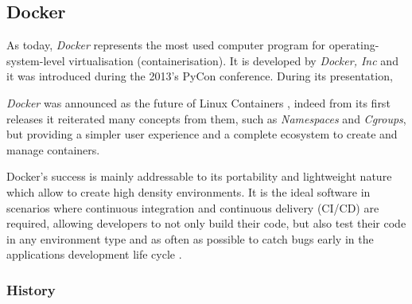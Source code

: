 \documentclass[a4paper,12pt]{article}
\begin{document}
\subsection{Docker}

As today, \textit{Docker} represents the most used computer program for
operating-system-level virtualisation (containerisation). It is developed by
\textit{Docker, Inc} \cite{docker_official_site} and it was introduced during the
2013's PyCon conference. During its presentation, \par\textit{Docker} was
announced as the future of Linux Containers \cite{docker_pycon_presentation},
indeed from its first releases it reiterated many concepts from them, such as
\textit{Namespaces} and \textit{Cgroups}, but providing a simpler user
experience and a complete ecosystem to create and manage containers.\par
Docker's success is mainly addressable to its portability and lightweight
nature which allow to create high density environments. It is the ideal software
in scenarios where continuous integration and continuous delivery (CI/CD) are
required, allowing developers to not only build their code, but also test their
code in any environment type and as often as possible to catch bugs early in the
applications development life cycle  \cite{docker_ci_cd}. 

\subsubsection{History}
\end{document}
